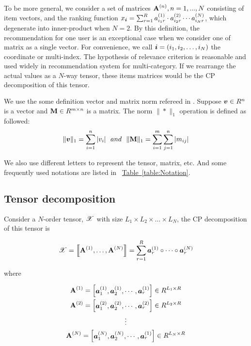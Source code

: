 \documentclass[letterpaper]{article}
\newcommand{\Sca}[3]{{#1}^{(#2)}_{i_#2#3}}%
\newcommand{\T}[1]{\boldsymbol{\mathscr{\MakeUppercase{#1}}}}
\newcommand{\KT}[1]{\left\llbracket #1 \right\rrbracket}
\newcommand{\V}[1]{{\bm{{\MakeLowercase{#1}}}}}
\newcommand{\VnC}[3]{\V{#1}^{(#2)}_{#3}}
\newcommand{\M}[1]{{\bm{\mathbf{\MakeUppercase{#1}}}}}
\newcommand{\Mn}[2]{\M{#1}^{(#2)}}
\newcommand{\norm}[2]{\|#1\|_{#2}}
\newcommand{\Table}[1] {\hyperref[table:#1] {Table~\ref*{table:#1}}} %
\begin{document}
To be more general, we consider a set of matrices $\M{A}^{(n)},n = 1,...,N$ consisting of item vectors, and the ranking function $x_\V{i} = \sum_{r=1}^{R}\Sca{a}{1}{r}\cdot\Sca{a}{2}{r}\cdots\Sca{a}{N}{r}$, which degenerate into inner-product when $N=2$. By this definition, the recommendation for one user is an exceptional case when we consider one of matrix as a single vector. For convenience, we call $\V{i} = (i_1,i_2,\ldots,i_N)$ the coordinate or multi-index. The hypothesis of relevance criterion is reasonable and used widely in recommendation system for multi-category. If we rearrange the actual values as a $N$-way tensor, these items matrices would be the CP decomposition of this tensor.


We use the some definition vector and matrix norm refereed in \cite{BaPiKoSe15}. Suppose $\V{v}\in R^n$ is a vector and $\M{M}\in R^{m\times n}$ is a matrix. The norm $\norm{*}{1}$ operation is defined as followed:
\[
    \norm{\V{v}}{1} = \sum_{i=1}^{n}|v_i|
    \ \  and \ \
    \norm{\M{M}}{1} = \sum_{i=1}^{m}\sum_{j=1}^{n}|m_{ij}|
\]

We also use different letters to represent the tensor, matrix, etc. And some frequently used notations are listed in ~\Table{Notation}.

\subsection{Tensor decomposition}

Consider a $N$-order tensor, $\T{X}$ with size $L_1\times L_2\times\ldots\times L_N$, the CP decomposition\cite{KoBa09} of this tensor is

\begin{equation}\label{eq:CPDecomposition}
\T{X}= \KT{ \Mn{A}{1},\dots,\Mn{A}{N}} =
\sum_{r=1}^{R}\VnC{A}{1}{r} \circ \cdots \circ \VnC{A}{N}{r}
\end{equation}

where

\begin{gather*}\label{eq:ColumnVectorsForm}
\M{A}^{(1)} =
\begin{bmatrix}\VnC{a}{1}{1},\VnC{a}{1}{2},\cdots,\VnC{a}{1}{r}\end{bmatrix}\in R^{L_1\times R}\\
\M{A}^{(2)} =
\begin{bmatrix}\VnC{a}{2}{1},\VnC{a}{2}{2},\cdots,\VnC{a}{2}{r}\end{bmatrix}\in R^{L_2\times R}\\
\vdots\\
\M{A}^{(N)} =
\begin{bmatrix}\VnC{a}{N}{1},\VnC{a}{N}{2},\cdots,\VnC{a}{1}{r}\end{bmatrix}\in R^{L_N\times R}\\
\end{gather*}
\end{document}
